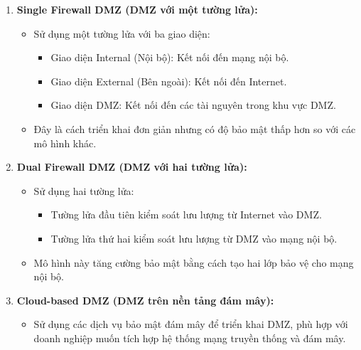\documentclass[13pt]{article}
\begin{document}
\begin{enumerate}
    \begin{enumerate}
        \item \textbf{Single Firewall DMZ (DMZ với một tường lửa):}
        \begin{itemize}
            \item Sử dụng một tường lửa với ba giao diện:
            \begin{itemize}
                \item Giao diện Internal (Nội bộ): Kết nối đến mạng nội bộ.
                \item Giao diện External (Bên ngoài): Kết nối đến Internet.
                \item Giao diện DMZ: Kết nối đến các tài nguyên trong khu vực DMZ.
            \end{itemize}
            \item Đây là cách triển khai đơn giản nhưng có độ bảo mật thấp hơn so với các mô hình khác.
        \end{itemize}
        
    \item \textbf{Dual Firewall DMZ (DMZ với hai tường lửa):}
    \begin{itemize}
        \item Sử dụng hai tường lửa:
        \begin{itemize}
            \item Tường lửa đầu tiên kiểm soát lưu lượng từ Internet vào DMZ.
            \item Tường lửa thứ hai kiểm soát lưu lượng từ DMZ vào mạng nội bộ.
        \end{itemize}
        \item Mô hình này tăng cường bảo mật bằng cách tạo hai lớp bảo vệ cho mạng nội bộ.  
    \end{itemize}
    
    \item \textbf{Cloud-based DMZ (DMZ trên nền tảng đám mây):}
    \begin{itemize}
        \item Sử dụng các dịch vụ bảo mật đám mây để triển khai DMZ, phù hợp với doanh nghiệp muốn tích hợp hệ thống mạng truyền thống và đám mây.
    \end{itemize}
    \end{enumerate}
\end{enumerate}
\end{document}
